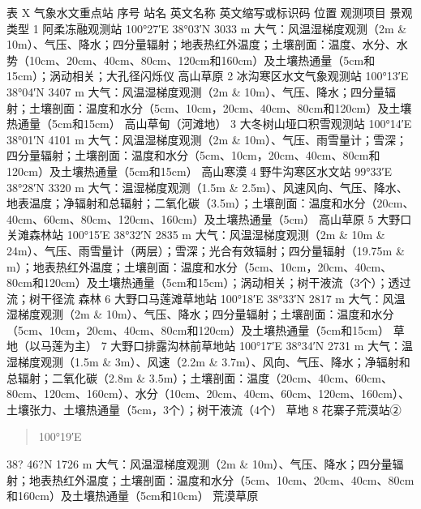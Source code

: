 \documentclass[letterpaper,10pt,english]{sphinxmanual}
\begin{document}
表 X  气象水文重点站
序号      站名      英文名称    英文缩写或标识码        位置      观测项目    景观类型
1       阿柔冻融观测站                 100°27′E
38°03′N
3033 m  大气：风温湿梯度观测（2m \& 10m）、气压、降水；四分量辐射；地表热红外温度；土壤剖面：温度、水分、水势（10cm、20cm、40cm、80cm、120cm和160cm）及土壤热通量（5cm和15cm）；涡动相关；大孔径闪烁仪     高山草原
2       冰沟寒区水文气象观测站                     100°13′E
38°04′N
3407 m  大气：风温湿梯度观测（2m \& 10m）、气压、降水；四分量辐射；土壤剖面：温度和水分（5cm、10cm，20cm、40cm、80cm和120cm）及土壤热通量（5cm和15cm）      高山草甸（河滩地）
3       大冬树山垭口积雪观测站                     100°14′E
38°01′N
4101 m  大气：风温湿梯度观测（2m \& 10m）、气压、雨雪量计；雪深；四分量辐射；土壤剖面：温度和水分（5cm、10cm，20cm、40cm、80cm和120cm）及土壤热通量（5cm和15cm） 高山寒漠
4       野牛沟寒区水文站                        99°33′E
38°28′N
3320 m  大气：温湿梯度观测（1.5m \& 2.5m）、风速风向、气压、降水、地表温度；净辐射和总辐射；二氧化碳（3.5m）；土壤剖面：温度和水分（20cm、40cm、60cm、80cm、120cm、160cm）及土壤热通量（5cm）        高山草原
5       大野口关滩森林站                        100°15′E
38°32′N
2835 m  大气：风温湿梯度观测（2m \& 10m \& 24m）、气压、雨雪量计（两层）；雪深；光合有效辐射；四分量辐射（19.75m \& m）；地表热红外温度；土壤剖面：温度和水分（5cm、10cm，20cm、40cm、80cm和120cm）及土壤热通量（5cm和15cm）；涡动相关；树干液流（3个）；透过流；树干径流     森林
6       大野口马莲滩草地站                       100°18′E
38°33′N
2817 m  大气：风温湿梯度观测（2m \& 10m）、气压、降水；四分量辐射；土壤剖面：温度和水分（5cm、10cm，20cm、40cm、80cm和120cm）及土壤热通量（5cm和15cm）      草地（以马莲为主）
7       大野口排露沟林前草地站                     100°17′E
38°34′N
2731 m  大气：温湿梯度观测（1.5m \& 3m）、风速（2.2m \& 3.7m）、风向、气压、降水；净辐射和总辐射；二氧化碳（2.8m \& 3.5m）；土壤剖面：温度（20cm、40cm、60cm、80cm、120cm、160cm）、水分（10cm、20cm、40cm、60cm、120cm、160cm）、土壤张力、土壤热通量（5cm，3个）；树干液流（4个）        草地
8       花寨子荒漠站②
\begin{quote}

100°19′E
\end{quote}

38? 46?N
1726 m  大气：风温湿梯度观测（2m \& 10m）、气压、降水；四分量辐射；地表热红外温度；土壤剖面：温度和水分（5cm、10cm、20cm、40cm、80cm和160cm）及土壤热通量（5cm和10cm）      荒漠草原
\end{document}
